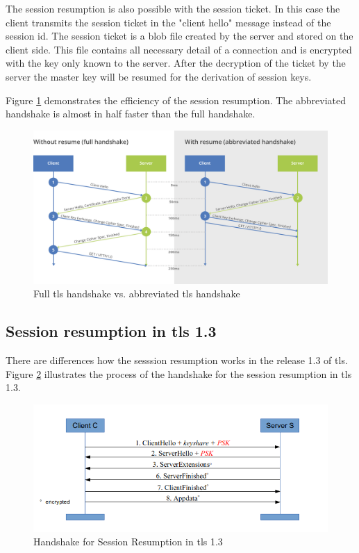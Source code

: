 The session resumption is also possible with the session ticket. In this case the client transmits the session ticket in the "client hello" message instead of the session id. The session ticket is a blob file created by the server and stored on the client side. This file contains all necessary detail of a connection and is encrypted with the key only known to the server. After the decryption of the ticket by the server the master key will be resumed for the derivation of session keys.

Figure \ref{fig:without-with-resume-1_2} demonstrates the efficiency of the session resumption. The abbreviated handshake is almost in half faster than the full handshake.

\begin{figure}[H]
	\centering
		\includegraphics[scale=0.4]{images/without-with-resume-1_2.png}
	\caption{Full \gls{tls} handshake vs. abbreviated \gls{tls} handshake \cite{cloudflare:resume}}
	\label{fig:without-with-resume-1_2}
\end{figure}

\subsection{Session resumption in \gls{tls} 1.3}
\label{subsec:resumption1_3}

There are differences how the sesssion resumption works in the release 1.3 of \gls{tls}. Figure \ref{fig:resumption1_3} illustrates the process of the handshake for the session resumption in \gls{tls} 1.3.

\begin{figure}[H]
	\centering
		\includegraphics[scale=0.8]{images/resumption1_3.png}
	\caption{Handshake for Session Resumption in \gls{tls} 1.3 \cite{Hassenstein}}
	\label{fig:resumption1_3}
\end{figure}


